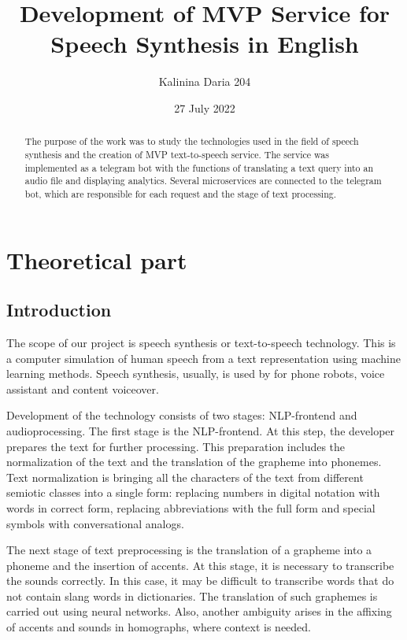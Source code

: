 \documentclass[10pt,a4paper]{report}
\title{Development of MVP Service for Speech Synthesis in English}
\author{Kalinina Daria 204}
\date{27 July 2022}
\begin{document}
\maketitle
\begin{abstract}
The purpose of the work was to study the technologies used in the field of speech synthesis and the creation of MVP text-to-speech service. The service was implemented as a telegram bot with the functions of translating a text query into an audio file and displaying analytics. Several microservices are connected to the telegram bot, which are responsible for each request and the stage of text processing.
\end{abstract}
\newpage
\tableofcontents
\newpage
\chapter{Theoretical part}

\section{Introduction}

The scope of our project is speech synthesis or text-to-speech technology. This is a computer simulation of human speech from a text representation using machine learning methods. Speech synthesis, usually, is used by for phone robots, voice assistant and content voiceover.
\newline

\noindent Development of the technology consists of two stages: NLP-frontend and audioprocessing.
The first stage is the NLP-frontend. At this step, the developer prepares the text for further processing. This preparation includes the normalization of the text and the translation of the grapheme into phonemes. Text normalization is bringing all the characters of the text from different semiotic classes into a single form: replacing numbers in digital notation with words in correct form, replacing abbreviations with the full form and special symbols with conversational analogs.
\newline

\noindent The next stage of text preprocessing is the translation of a grapheme into a phoneme and the insertion of accents. At this stage, it is necessary to transcribe the sounds correctly. In this case, it may be difficult to transcribe words that do not contain slang words in dictionaries. The translation of such graphemes is carried out using neural networks. Also, another ambiguity arises in the affixing of accents and sounds in homographs, where context is needed. 
\end{document}
